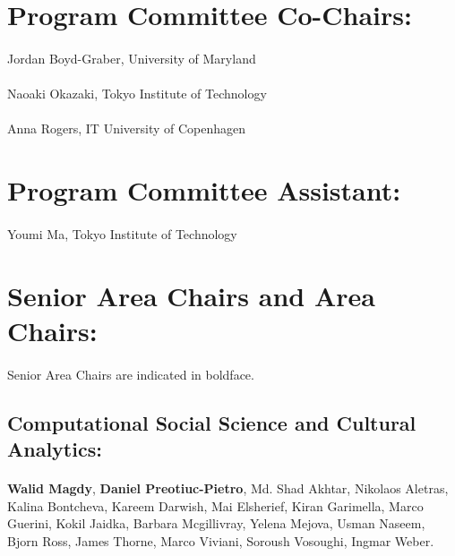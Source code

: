 \section*{Program Committee Co-Chairs:}
\paragraph{} Jordan Boyd-Graber, University of Maryland
\paragraph{} Naoaki Okazaki, Tokyo Institute of Technology
\paragraph{} Anna Rogers, IT University of Copenhagen

\section*{Program Committee Assistant:}

\paragraph{} Youmi Ma, Tokyo Institute of Technology

\section*{Senior Area Chairs and Area Chairs:}

\paragraph{} Senior Area Chairs are indicated in boldface.

\subsection*{Computational Social Science and Cultural Analytics:}
\paragraph{}\textbf{Walid Magdy}, \textbf{Daniel Preotiuc-Pietro}, Md. Shad Akhtar, Nikolaos Aletras, Kalina Bontcheva, Kareem Darwish, Mai Elsherief, Kiran Garimella, Marco Guerini, Kokil Jaidka, Barbara Mcgillivray, Yelena Mejova, Usman Naseem, Bjorn Ross, James Thorne, Marco Viviani, Soroush Vosoughi, Ingmar Weber.
